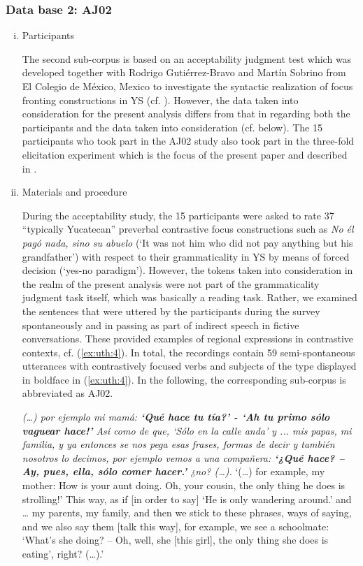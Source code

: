 \documentclass[output=paper]{langsci/langscibook}
\begin{document}
\subsubsection{Data base 2: AJ02}
\label{sec:uth:3.3}
\begin{enumerate}[(i)]
\item{Participants}

The second sub-corpus is based on an acceptability judgment test which was developed together with Rodrigo Gutiérrez-Bravo and Martín Sobrino from El Colegio de México, Mexico to investigate the syntactic realization of focus fronting constructions in YS (cf. \citealt{GutierrezBravoetal17}). However, the data taken into consideration for the present analysis differs from that in \citet{GutierrezBravoetal17} regarding both the participants and the data taken into consideration (cf. below). The 15 participants who took part in the AJ02 study also took part in the three-fold elicitation experiment which is the focus of the present paper and described in . 


\item{Materials and procedure}

During the acceptability study, the 15 participants were asked to rate 37 “typically Yucatecan” preverbal contrastive focus constructions such as \textit{No él pagó nada, sino su abuelo} (‘It was not him who did not pay anything but his grandfather’) with respect to their grammaticality in YS by means of forced decision (‘yes-no paradigm’). However, the tokens taken into consideration in the realm of the present analysis were not part of the grammaticality judgment task itself, which was basically a reading task. Rather, we examined the sentences that were uttered by the participants during the survey spontaneously and in passing as part of indirect speech in fictive conversations. These provided examples of regional expressions in contrastive contexts, cf. (\ref{ex:uth:4}). In total, the recordings contain 59 semi-spontaneous utterances with contrastively focused verbs and subjects of the type displayed in boldface in (\ref{ex:uth:4}). In the following, the corresponding sub-corpus is abbreviated as AJ02.
 
\ea\label{ex:uth:4}
  \textit{(…) por ejemplo mi mamá: \textbf{‘Qué hace tu tía?’ - ‘Ah tu primo sólo vaguear hace!’} Así como de que, ‘Sólo en la calle anda’ y ... mis papas, mi familia, y ya entonces se nos pega esas frases, formas de decir y también nosotros lo decimos, por ejemplo vemos a una compañera: \textbf{‘¿Qué hace? – Ay, pues, ella, sólo comer hacer.’} ¿no? (…).}
\glt  ‘(…) for example, my mother: How is your aunt doing. Oh, your cousin, the only thing he does is strolling!’ This way, as if [in order to say] ‘He is only wandering around.’ and … my parents, my family, and then we stick to these phrases, ways of saying, and we also say them [talk this way], for example, we see a schoolmate: ‘What's she doing? – Oh, well, she [this girl], the only thing she does is eating’, right? (…).’
 

\end{enumerate}
\end{document}
